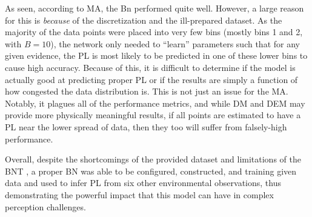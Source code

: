 \documentclass[12pt]{article}
\begin{document}
As seen, according to MA, the Bn performed quite well. However, a large reason for this is \textit{because} of the discretization and the ill-prepared dataset. As the majority of the data points were placed into very few bins (mostly bins 1 and 2, with $B=10$), the network only needed to ``learn'' parameters such that for any given evidence, the PL is most likely to be predicted in one of these lower bins to cause high accuracy. Because of this, it is difficult to determine if the model is actually good at predicting proper PL or if the results are simply a function of how congested the data distribution is. This is not just an issue for the MA. Notably, it plagues all of the performance metrics, and while DM and DEM may provide more physically meaningful results, if all points are estimated to have a PL near the lower spread of data, then they too will suffer from falsely-high performance.

Overall, despite the shortcomings of the provided dataset and limitations of the BNT \cite{BNT}, a proper BN was able to be configured, constructed, and training given data and used to infer PL from six other environmental observations, thus demonstrating the powerful impact that this model can have in complex perception challenges.

\clearpage
\printbibliography[title={\textbf{REFERENCES}}]
\end{document}
